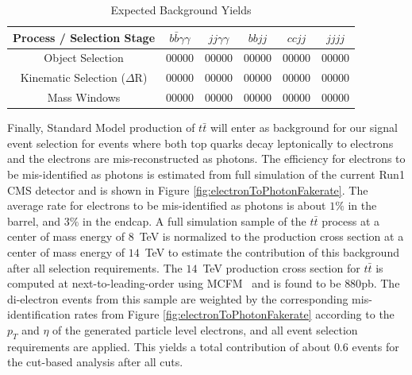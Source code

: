 \documentclass{cmspaper}
\begin{document}
\begin{table}[!ht]
\begin{center} 
\begin{tabular}{|c|c|c|c|c|c|}
\hline
Process / Selection Stage       &  $b \bar{b} \gamma\gamma$ & $jj \gamma\gamma$ &  $bb jj$ & $cc jj$  &  $jjjj$    \\  \hline
Object Selection                &  00000                    &  00000            &  00000   & 00000    &  00000     \\ 
Kinematic Selection ($\Delta$R) &  00000                    &  00000            &  00000   & 00000    &  00000     \\ 
Mass Windows                    &  00000                    &  00000            &  00000   & 00000    &  00000     \\ \hline

\end{tabular}
\caption{Expected Background Yields }
\label{tab:bkgEventYields}
\end{center}
\end{table}



Finally, Standard Model production of $t\bar{t}$ will enter as background for our signal event selection
for events where both top quarks decay leptonically to electrons and the electrons are mis-reconstructed
as photons. The efficiency for electrons to be mis-identified as photons is estimated from full simulation
of the current Run1 CMS detector and is shown in Figure \ref{fig:electronToPhotonFakerate}. The average
rate for electrons to be mis-identified as photons is about $1\%$ in the barrel, and $3\%$ in the endcap.
A full simulation sample of the $t\bar{t}$ process at a center of mass energy of $8$~TeV is normalized
to the production cross section at a center of mass energy of $14$~TeV to estimate the contribution
of this background after all selection requirements. The $14$~TeV production cross section for 
$t\bar{t}$ is computed at next-to-leading-order using MCFM~\cite{MCFM} and is found to 
be $880$pb. The di-electron events from this sample are
weighted by the corresponding mis-identification rates from Figure \ref{fig:electronToPhotonFakerate}
according to the $p_{T}$ and $\eta$ of the generated particle level electrons, and all event selection
requirements are applied. This yields a total contribution of about $0.6$ events for the cut-based
analysis after all cuts.
\end{document}
